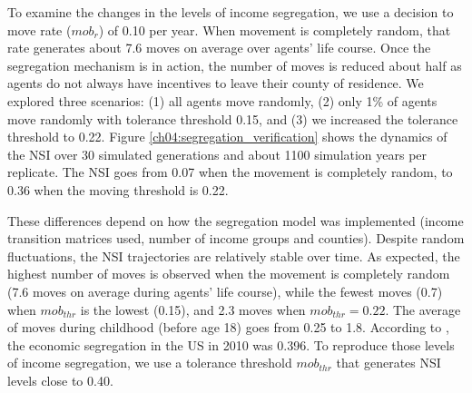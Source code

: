 To examine the changes in the levels of income segregation, we use a decision to move rate ($mob_r$) of 0.10 per year. When movement is completely random, that rate generates  about 7.6 moves on average over agents' life course. Once the segregation mechanism is in action, the number of moves is reduced about half as agents do not always have incentives to leave their county of residence. We explored three scenarios: (1) all agents move randomly, (2) only 1\% of agents move randomly with tolerance threshold 0.15, and (3) we increased the tolerance threshold to 0.22. Figure \ref{ch04:segregation_verification} shows the dynamics of the NSI over 30 simulated generations and about 1100 simulation years per replicate. The NSI goes from 0.07 when the movement is completely random, to 0.36 when the moving threshold is 0.22. 



These differences depend on how the segregation model was implemented (income transition matrices used, number of income groups and counties). Despite random fluctuations, the NSI trajectories are relatively stable over time. As expected, the highest number of moves is observed when the movement is completely random (7.6 moves on average during  agents' life course), while the fewest moves (0.7) when $mob_{thr}$ is the lowest (0.15), and 2.3 moves when $mob_{thr} = 0.22$. The average of moves during childhood (before age 18) goes from 0.25 to 1.8. According to \citet{jargowsky2017}, the economic segregation in the US in 2010 was 0.396. To reproduce those levels of income segregation, we use a tolerance threshold $mob_{thr}$ that generates NSI levels close to 0.40.




